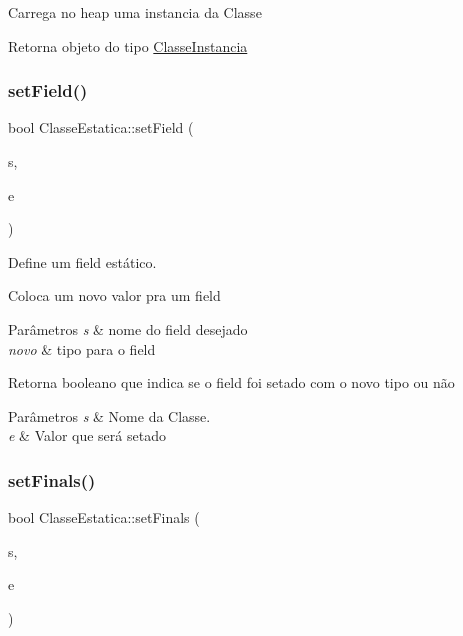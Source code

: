 Carrega no heap uma instancia da Classe \begin{DoxyReturn}{Retorna}
objeto do tipo \hyperlink{classClasseInstancia}{Classe\+Instancia} 
\end{DoxyReturn}
\mbox{\label{classClasseEstatica_acc2669d695a4f733ec61f2c77eb92920}} 
\subsubsection{\texorpdfstring{set\+Field()}{setField()}}
{\footnotesize\ttfamily bool Classe\+Estatica\+::set\+Field (\begin{DoxyParamCaption}\item[{string}]{s,  }\item[{\hyperlink{structtypedElement__s}{typed\+Element}}]{e }\end{DoxyParamCaption})}



Define um field estático. 

Coloca um novo valor pra um field 
\begin{DoxyParams}{Parâmetros}
{\em s} & nome do field desejado \\
\hline
{\em novo} & tipo para o field \\
\hline
\end{DoxyParams}
\begin{DoxyReturn}{Retorna}
booleano que indica se o field foi setado com o novo tipo ou não
\end{DoxyReturn}

\begin{DoxyParams}{Parâmetros}
{\em s} & Nome da Classe. \\
\hline
{\em e} & Valor que será setado \\
\hline
\end{DoxyParams}
\mbox{\label{classClasseEstatica_a58dcce56287bc06d3e076382ec85df09}} 
\subsubsection{\texorpdfstring{set\+Finals()}{setFinals()}}
{\footnotesize\ttfamily bool Classe\+Estatica\+::set\+Finals (\begin{DoxyParamCaption}\item[{string}]{s,  }\item[{\hyperlink{structtypedElement__s}{typed\+Element}}]{e }\end{DoxyParamCaption})}



